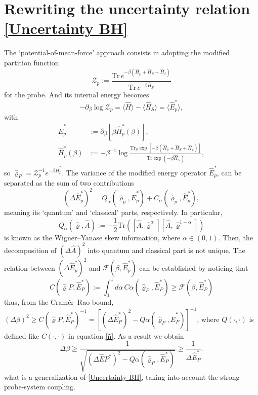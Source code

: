 \section{Rewriting the uncertainty relation \ref{Uncertainty BH}}\label{Modified Uncertainty}


The ‘potential-of-mean-force’ approach consists in adopting the modified partition function
\begin{equation}
\mathcal{Z}_p := \frac{\mathrm{Tr}\, e^{-\beta(\hat{H}_p + \hat{H}_S + \hat{H}_I)}}{\mathrm{Tr}\, e^{-\beta \hat{H}_S}}
\end{equation}
for the probe. And its internal energy becomes
\begin{equation}
- \partial_\beta \log \mathcal{Z}_p = \langle \hat{H} \rangle - \langle \hat{H}_S \rangle = \langle \hat{E}_p^\ast \rangle,
\end{equation}
with
\begin{align}
\hat{E}_p^\ast &:= \partial_\beta \left[ \beta \hat{H}_p^\ast(\beta) \right],  \\
\hat{H}_p^\ast(\beta) &:= -\beta^{-1} \log \frac{\mathrm{Tr}_S \exp \left[ -\beta (\hat{H}_p + \hat{H}_S + \hat{H}_I) \right]}{\mathrm{Tr} \exp(-\beta \hat{H}_S)},
\end{align}
so \( \hat{\varrho}_P = \mathcal{Z}_p^{-1} e^{-\beta \hat{H}_p^\ast} \). The variance of the modified energy operator \( \hat{E}_p^\ast \), can be separated as the sum of two contributions
\begin{equation}
(\Delta \hat{E}_p^\ast)^2 = Q_\alpha(\hat{\varrho}_p, \hat{E}_p^\ast) + C_\alpha(\hat{\varrho}_p, \hat{E}_p^\ast),
\end{equation}
meaning its ‘quantum’ and ‘classical’ parts, respectively. In particular,
\begin{equation}
Q_\alpha(\hat{\varrho}, \hat{A}) := -\frac{1}{2} \mathrm{Tr} \left( \left[ \hat{A}, \hat{\varrho}^\alpha \right] \left[ \hat{A}, \hat{\varrho}^{1 - \alpha} \right] \right)
\end{equation}
is known as the Wigner–Yanase skew information, where \( \alpha \in (0,1) \). Then, the decomposition of \( (\Delta \hat{A})^2 \) into quantum and classical part is not unique. The relation between \( (\Delta \hat{E}_p^\ast)^2 \) and \( \mathcal{F}(\beta, \hat{E}_p^\ast) \) can be established by noticing that
\begin{equation} \label{ñ}
C(\hat{\varrho}P, \hat{E}_P^\ast) := \int_0^1 d\alpha\, C\alpha(\hat{\varrho}_P, \hat{E}_P^\ast) \geq \mathcal{F}(\beta, \hat{E}_P^\ast)
\end{equation}
thus, from the Cramér–Rao bound, \( (\Delta \beta)^2 \geq C(\hat{\varrho}P, \hat{E}_P^\ast)^{-1} = \left[(\Delta \hat{E}_P^\ast)^2 - Q\alpha(\hat{\varrho}_P, \hat{E}_P^\ast) \right]^{-1} \), where \( Q(\cdot, \cdot) \) is defined like \( C(\cdot, \cdot) \) in equation \eqref{ñ}. As a result we obtain
\begin{equation}
\Delta \beta \geq \frac{1}{\sqrt{(\Delta \hat{E}P^\ast)^2 - Q\alpha(\hat{\varrho}_P, \hat{E}_P^\ast)}} \geq \frac{1}{\Delta \hat{E}_P^\ast}.
\end{equation}
what is a generalization of \eqref{Uncertainty BH}, taking into account the strong probe-system coupling.

